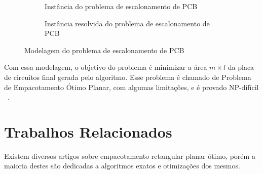 \documentclass[12pt]{article}
\begin{document}
        \begin{figure}[H]
            \centering
            \begin{subfigure}[b]{0.5\textwidth}
                \centering
                \caption{Instância do problema de escalonamento de PCB}
            \end{subfigure}
            \begin{subfigure}[b]{0.5\textwidth}
                \centering
                \caption{Instância resolvida do problema de escalonamento de PCB}
            \end{subfigure}
            \caption{Modelagem do problema de escalonamento de PCB}
            \label{fig:m}
        \end{figure}

        Com essa modelagem, o objetivo do problema é minimizar a área $m \times l$ da placa de circuitos final gerada pelo algoritmo. Esse problema
        é chamado de Problema de Empacotamento Ótimo Planar, com algumas limitações, e é provado NP-difícil ~\cite{FOWLER1981133}.


    \section{Trabalhos Relacionados} %
    \label{sec:Trabalhos Relacionados}
    Existem diversos artigos sobre empacotamento retangular planar ótimo, porém a maioria destes são dedicadas a algoritmos exatos e otimizações dos
    mesmos.
\end{document}
